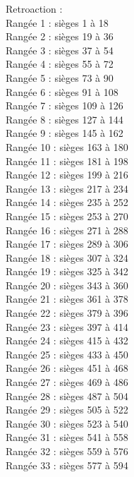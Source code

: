 ﻿\documentclass[letterpaper, 12pt]{article}
\begin{document}
Retroaction : \\
Rang\'ee 1 : si\`eges 1 \`a 18\\
Rang\'ee 2 : si\`eges 19 \`a 36\\
Rang\'ee 3 : si\`eges 37 \`a 54\\
Rang\'ee 4 : si\`eges 55 \`a 72\\
Rang\'ee 5 : si\`eges 73 \`a 90\\
Rang\'ee 6 : si\`eges 91 \`a 108\\
Rang\'ee 7 : si\`eges 109 \`a 126\\
Rang\'ee 8 : si\`eges 127 \`a 144\\
Rang\'ee 9 : si\`eges 145 \`a 162\\
Rang\'ee 10 : si\`eges 163 \`a 180\\
Rang\'ee 11 : si\`eges 181 \`a 198\\
Rang\'ee 12 : si\`eges 199 \`a 216\\
Rang\'ee 13 : si\`eges 217 \`a 234\\
Rang\'ee 14 : si\`eges 235 \`a 252\\
Rang\'ee 15 : si\`eges 253 \`a 270\\
Rang\'ee 16 : si\`eges 271 \`a 288\\
Rang\'ee 17 : si\`eges 289 \`a 306\\
Rang\'ee 18 : si\`eges 307 \`a 324\\
Rang\'ee 19 : si\`eges 325 \`a 342\\
Rang\'ee 20 : si\`eges 343 \`a 360\\
Rang\'ee 21 : si\`eges 361 \`a 378\\
Rang\'ee 22 : si\`eges 379 \`a 396\\
Rang\'ee 23 : si\`eges 397 \`a 414\\
Rang\'ee 24 : si\`eges 415 \`a 432\\
Rang\'ee 25 : si\`eges 433 \`a 450\\
Rang\'ee 26 : si\`eges 451 \`a 468\\
Rang\'ee 27 : si\`eges 469 \`a 486\\
Rang\'ee 28 : si\`eges 487 \`a 504\\
Rang\'ee 29 : si\`eges 505 \`a 522\\
Rang\'ee 30 : si\`eges 523 \`a 540\\
Rang\'ee 31 : si\`eges 541 \`a 558\\
Rang\'ee 32 : si\`eges 559 \`a 576\\
Rang\'ee 33 : si\`eges 577 \`a 594\\
\end{document}
